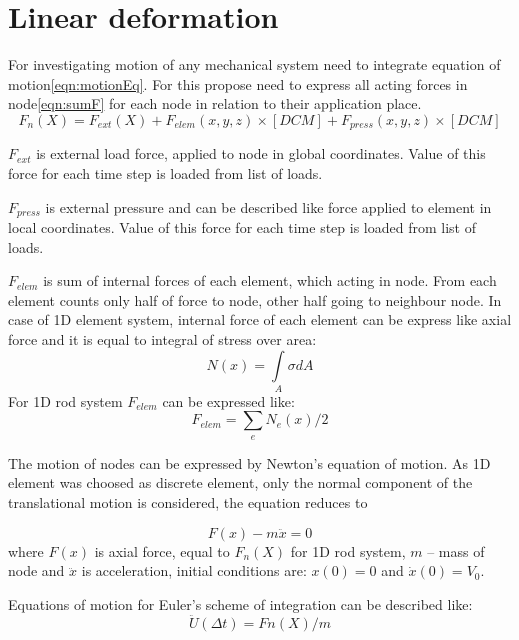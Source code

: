 \section*{Linear deformation}
For investigating motion of any mechanical system need to integrate equation of
motion\eqref{eqn:motionEq}. For this propose need to express all acting forces in
node\eqref{eqn:sumF} for each node in relation to their application place. 
\begin{equation}\label{eqn:sumF}
   F_n(X)=
   F_{ext}(X)+
   F_{elem}(x, y, z)\times[DCM]+
   F_{press}(x, y, z)\times[DCM]
\end{equation}\par
$F_{ext}$ is external load force, applied to node in global coordinates. Value
of this force for each time step is loaded from list of loads.\par $F_{press}$
is external pressure and can be described like force applied to element in local
coordinates. Value of this force for each time step is loaded from list of
loads.\par $F_{elem}$ is sum of internal forces of each element, which acting in
node. From each element counts only half of force to node, other half going to
neighbour node. In case of 1D element system, internal force of each element can
be express like axial force and it is equal to integral of stress over area:
\begin{equation}\label{eqn:Nx}
  N(x)= \int\limits_A \sigma dA
\end{equation}
For 1D rod system $F_{elem}$ can be expressed like:
\begin{equation}\label{eqn:Felem}
  F_{elem}= \sum_{e}N_e(x)/2
\end{equation}\par
The motion of nodes can be expressed by Newton's equation of motion. As 1D
element was choosed as discrete element, only the normal component of the
translational motion is considered, the equation reduces to\par
\begin{equation}\label{eqn:motionEq}
   F(x)-m\ddot{x}=0
\end{equation}
where $F(x)$ is axial force, equal to $F_n(X)$ for 1D rod system, $m$ – mass of
node and $\ddot{x}$ is acceleration, initial conditions are: $x(0)=0$ and
$\dot{x}(0)=V_0$.\par Equations of motion for Euler's scheme of integration can
be described like:
\begin{equation}\label{eqn:Accel}
  \ddot{U}(\Delta t)=Fn(X)/m
\end{equation}
